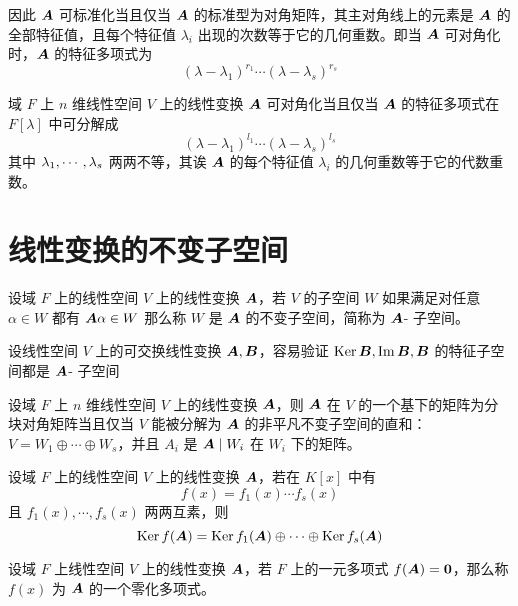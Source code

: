 因此 $\boldsymbol{A}$ 可标准化当且仅当 $\boldsymbol{A}$ 的标准型为对角矩阵，其主对角线上的元素是 $\boldsymbol{A}$ 的全部特征值，且每个特征值 $\lambda_i$ 出现的次数等于它的几何重数。即当 $\boldsymbol{A}$ 可对角化时，$\boldsymbol{A}$ 的特征多项式为
\[ (\lambda - \lambda_1)^{r_1}\cdots(\lambda - \lambda_s)^{r_s} \]

\begin{theorem}
	域 $F$ 上 $n$ 维线性空间 $V$ 上的线性变换 $\boldsymbol{A}$ 可对角化当且仅当 $\boldsymbol{A}$ 的特征多项式在 $F[\lambda]$ 中可分解成
	\[ (\lambda - \lambda_1)^{l_1} \cdots (\lambda - \lambda_s)^{l_s} \]
	其中 $\lambda_1,\cdots,\lambda_s$ 两两不等，其诶 $\boldsymbol{A}$ 的每个特征值 $\lambda_i$ 的几何重数等于它的代数重数。
\end{theorem}

\section{线性变换的不变子空间}

\begin{definition}[不变子空间] 
	设域 $F$ 上的线性空间 $V$ 上的线性变换 $\boldsymbol{A}$，若 $V$ 的子空间 $W$ 如果满足对任意 $\alpha \in W$ 都有 $\boldsymbol{A} \alpha \in W$ 那么称 $W$ 是 $\boldsymbol{A}$ 的不变子空间，简称为 $\boldsymbol{A}$- 子空间。
\end{definition}

设线性空间 $V$ 上的可交换线性变换 $\boldsymbol{A},\boldsymbol{B}$，容易验证 $\operatorname{Ker} \boldsymbol{B},\operatorname{Im} \boldsymbol{B},\boldsymbol{B}$ 的特征子空间都是 $\boldsymbol{A}$- 子空间

\begin{theorem}
	设域 $F$ 上 $n$ 维线性空间 $V$ 上的线性变换 $\boldsymbol{A}$，则 $\boldsymbol{A}$ 在 $V$ 的一个基下的矩阵为分块对角矩阵当且仅当 $V$ 能被分解为 $\boldsymbol{A}$ 的非平凡不变子空间的直和：$V = W_1 \oplus \cdots \oplus W_s$，并且 $A_i$ 是 $\boldsymbol{A} \mid W_i$ 在 $W_i$ 下的矩阵。
\end{theorem}

\begin{theorem}
	设域 $F$ 上的线性空间 $V$ 上的线性变换 $\boldsymbol{A}$，若在 $K[x]$ 中有
	\[ f(x) = f_1(x) \cdots f_s(x) \]
	且 $f_1(x),\cdots,f_s(x)$ 两两互素，则
	\[ \operatorname{Ker} f(\boldsymbol{A}) = \operatorname{Ker} f_1(\boldsymbol{A}) \oplus \cdots \oplus \operatorname{Ker} f_s(\boldsymbol{A}) \]
\end{theorem}

\begin{definition}[零化多项式] 
	设域 $F$ 上线性空间 $V$ 上的线性变换 $\boldsymbol{A}$，若 $F$ 上的一元多项式 $f(\boldsymbol{A}) = \boldsymbol{0}$，那么称 $f(x)$ 为 $\boldsymbol{A}$ 的一个零化多项式。
\end{definition}

